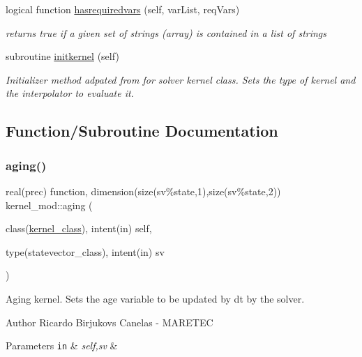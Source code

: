 \begin{DoxyCompactItemize}
logical function \mbox{\hyperlink{namespacekernel__mod_a4444d73e7295ba4b58add9b726de3135}{hasrequiredvars}} (self, var\+List, req\+Vars)
\begin{DoxyCompactList}\small\item\em returns true if a given set of strings (array) is contained in a list of strings \end{DoxyCompactList}\item 
subroutine \mbox{\hyperlink{namespacekernel__mod_a26c62a8eec723402e20142e68ba7ec65}{initkernel}} (self)
\begin{DoxyCompactList}\small\item\em Initializer method adpated from for solver kernel class. Sets the type of kernel and the interpolator to evaluate it. \end{DoxyCompactList}\end{DoxyCompactItemize}


\subsection{Function/\+Subroutine Documentation}
\mbox{\label{namespacekernel__mod_ac2352f3964b072607ed042e70a59b9f2}} 
\subsubsection{\texorpdfstring{aging()}{aging()}}
{\footnotesize\ttfamily real(prec) function, dimension(size(sv\%state,1),size(sv\%state,2)) kernel\+\_\+mod\+::aging (\begin{DoxyParamCaption}\item[{class(\mbox{\hyperlink{structkernel__mod_1_1kernel__class}{kernel\+\_\+class}}), intent(in)}]{self,  }\item[{type(statevector\+\_\+class), intent(in)}]{sv }\end{DoxyParamCaption})}



Aging kernel. Sets the age variable to be updated by dt by the solver. 

\begin{DoxyAuthor}{Author}
Ricardo Birjukovs Canelas -\/ M\+A\+R\+E\+T\+EC 
\end{DoxyAuthor}

\begin{DoxyParams}[1]{Parameters}
\mbox{\tt in}  & {\em self,sv} & \\
\hline
\end{DoxyParams}


